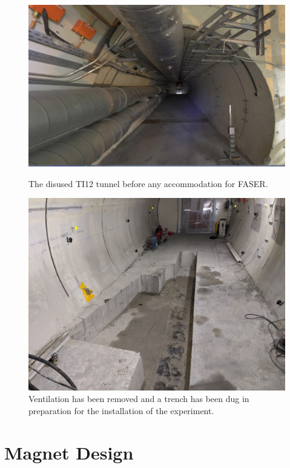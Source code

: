 \begin{figure}[htbp!] 
\centering
\begin{minipage}{.5\textwidth}
  \centering
  \includegraphics[width=.9\linewidth]{TunnelBefore}
  \captionsetup{width=0.8\textwidth}
  \caption[Unused TI12]{The disused TI12 tunnel before any accommodation for FASER.}
  \label{fig:TunnelBefore}
\end{minipage}%
\begin{minipage}{.5\textwidth}
  \centering
  \includegraphics[width=.85\linewidth]{CEworks1.JPG}
  \captionsetup{width=0.8\textwidth}
  \caption[TI12 after civil engineering work]{Ventilation has been removed and a trench has been dug in preparation for the installation of the experiment.}
  \label{fig:TunnelAfter}
\end{minipage}
\end{figure}


\section{Magnet Design}

